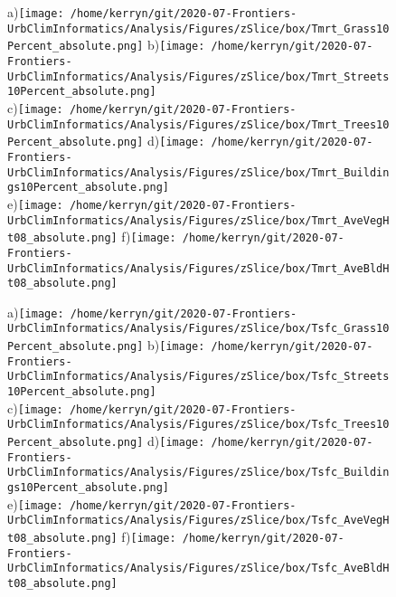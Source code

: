 \documentclass{article}
\begin{document}
\begin{figure}
\centering    
a)\texttt{[image: /home/kerryn/git/2020-07-Frontiers-UrbClimInformatics/Analysis/Figures/zSlice/box/Tmrt\_Grass10Percent\_absolute.png]}
b)\texttt{[image: /home/kerryn/git/2020-07-Frontiers-UrbClimInformatics/Analysis/Figures/zSlice/box/Tmrt\_Streets10Percent\_absolute.png]}\\
c)\texttt{[image: /home/kerryn/git/2020-07-Frontiers-UrbClimInformatics/Analysis/Figures/zSlice/box/Tmrt\_Trees10Percent\_absolute.png]}
d)\texttt{[image: /home/kerryn/git/2020-07-Frontiers-UrbClimInformatics/Analysis/Figures/zSlice/box/Tmrt\_Buildings10Percent\_absolute.png]}\\
e)\texttt{[image: /home/kerryn/git/2020-07-Frontiers-UrbClimInformatics/Analysis/Figures/zSlice/box/Tmrt\_AveVegHt08\_absolute.png]}
f)\texttt{[image: /home/kerryn/git/2020-07-Frontiers-UrbClimInformatics/Analysis/Figures/zSlice/box/Tmrt\_AveBldHt08\_absolute.png]}
\end{figure} 
\clearpage

\begin{figure}
\centering    
a)\texttt{[image: /home/kerryn/git/2020-07-Frontiers-UrbClimInformatics/Analysis/Figures/zSlice/box/Tsfc\_Grass10Percent\_absolute.png]}
b)\texttt{[image: /home/kerryn/git/2020-07-Frontiers-UrbClimInformatics/Analysis/Figures/zSlice/box/Tsfc\_Streets10Percent\_absolute.png]}\\
c)\texttt{[image: /home/kerryn/git/2020-07-Frontiers-UrbClimInformatics/Analysis/Figures/zSlice/box/Tsfc\_Trees10Percent\_absolute.png]}
d)\texttt{[image: /home/kerryn/git/2020-07-Frontiers-UrbClimInformatics/Analysis/Figures/zSlice/box/Tsfc\_Buildings10Percent\_absolute.png]}\\
e)\texttt{[image: /home/kerryn/git/2020-07-Frontiers-UrbClimInformatics/Analysis/Figures/zSlice/box/Tsfc\_AveVegHt08\_absolute.png]}
f)\texttt{[image: /home/kerryn/git/2020-07-Frontiers-UrbClimInformatics/Analysis/Figures/zSlice/box/Tsfc\_AveBldHt08\_absolute.png]}
\end{figure} 
\clearpage
\end{document}
